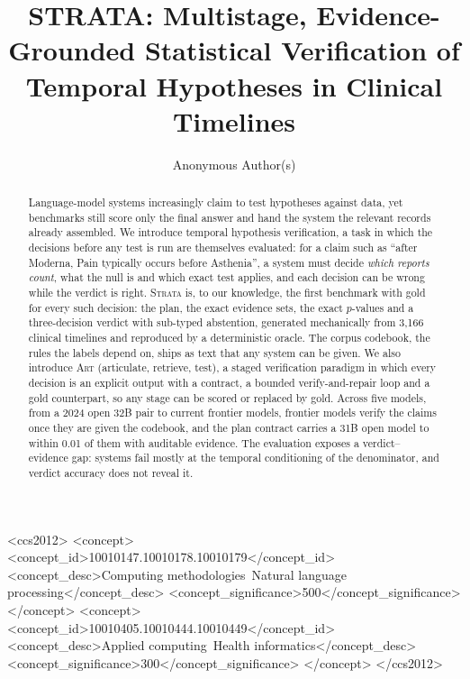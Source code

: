 \documentclass[sigconf,anonymous,review]{acmart}
\begin{document}
\title{STRATA: Multistage, Evidence-Grounded Statistical Verification of Temporal Hypotheses in Clinical Timelines}

\author{Anonymous Author(s)}

\begin{abstract}
Language-model systems increasingly claim to test hypotheses against data,
yet benchmarks still score only the final answer and hand the system the
relevant records already assembled. We introduce temporal hypothesis
verification, a task in which the decisions before any test is run are
themselves evaluated: for a claim such as ``after Moderna, Pain typically
occurs before Asthenia'', a system must decide \emph{which reports count},
what the null is and which exact test applies, and each decision can be
wrong while the verdict is right. \textsc{Strata} is, to our knowledge, the
first benchmark with gold for every such decision: the plan, the exact
evidence sets, the exact $p$-values and a three-decision verdict with
sub-typed abstention, generated mechanically from 3{,}166 clinical
timelines and reproduced by a deterministic oracle. The corpus codebook, the
rules the labels depend on, ships as text that any system can be given. We
also introduce \textsc{Art} (articulate, retrieve, test), a staged
verification paradigm in which every decision is an explicit output with a
contract, a bounded verify-and-repair loop and a gold counterpart, so any
stage can be scored or replaced by gold. Across five models, from a 2024
open 32B pair to current frontier models, frontier models verify the claims
once they are given the codebook, and the plan contract carries a 31B open
model to within 0.01 of them with auditable evidence. The evaluation exposes
a verdict--evidence gap: systems fail mostly at the temporal conditioning of
the denominator, and verdict accuracy does not reveal it.
\end{abstract}

\begin{CCSXML}
<ccs2012>
<concept>
<concept_id>10010147.10010178.10010179</concept_id>
<concept_desc>Computing methodologies~Natural language processing</concept_desc>
<concept_significance>500</concept_significance>
</concept>
<concept>
<concept_id>10010405.10010444.10010449</concept_id>
<concept_desc>Applied computing~Health informatics</concept_desc>
<concept_significance>300</concept_significance>
</concept>
</ccs2012>
\end{CCSXML}


\maketitle







\end{document}
